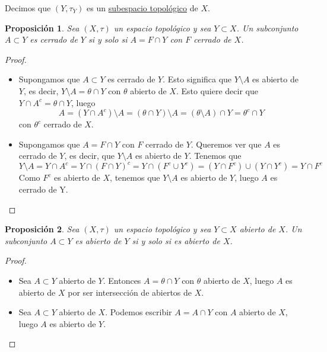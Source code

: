 \documentclass[12pt]{report}
\newtheorem{proposition}{Proposición}[chapter]
\theoremstyle{definition}
\theoremstyle{definition}
\theoremstyle{remark}
\begin{document}
Decimos que $(Y,\tau_Y)$ es un \underline{subespacio topológico} de $X$.

\begin{proposition}
Sea $(X,\tau)$ un espacio topológico y sea $Y \subset X$. Un subconjunto $A \subset Y$ es cerrado de $Y$ si y solo si $A = F \cap Y$ con $F$ cerrado de $X$.
\end{proposition}

\begin{proof}
\hfill
\begin{itemize}
    \item[{\fbox[rb]{$\Rightarrow$}}] Supongamos que $A \subset Y$ es cerrado de $Y$. Esto significa que $Y \setminus A$ es abierto de $Y$, es decir, $Y \setminus A = \theta \cap Y$ con $\theta$ abierto de $X$. Esto quiere decir que $Y \cap A^c = \theta \cap Y$, luego \[A = (Y \cap A^c) \setminus A = (\theta \cap Y) \setminus A = (\theta \setminus A) \cap Y = \theta^c \cap Y\] con $\theta^c$ cerrado de $X$.
    \item[{\fbox[rb]{$\Leftarrow$}}] Supongamos que $A = F \cap Y$ con $F$ cerrado de $Y$. Queremos ver que $A$ es cerrado de $Y$, es decir, que $Y \setminus A$ es abierto de $Y$. Tenemos que \[Y \setminus A = Y \cap A^c = Y \cap (F \cap Y)^c = Y \cap (F^c \cup Y^c) = (Y \cap F^c) \cup (Y \cap Y^c) = Y \cap F^c\] Como $F^c$ es abierto de $X$, tenemos que $Y \setminus A$ es abierto de $Y$, luego $A$ es cerrado de Y.
\end{itemize}
\end{proof}

\begin{proposition} 
\label{prop1.9.}
Sea $(X,\tau)$ un espacio topológico y sea $Y \subset X$ abierto de $X$. Un subconjunto $A \subset Y$ es abierto de $Y$ si y solo si es abierto de $X$.
\end{proposition}

\begin{proof}
\hfill
\begin{itemize}
    \item[{\fbox[rb]{$\Rightarrow$}}] Sea $A \subset Y$ abierto de $Y$. Entonces $A = \theta \cap Y$ con $\theta$ abierto de $X$, luego $A$ es abierto de $X$ por ser intersección de abiertos de $X$.
    \item[{\fbox[rb]{$\Leftarrow$}}] Sea $A \subset Y$ abierto de $X$. Podemos escribir $A = A \cap Y$ con $A$ abierto de $X$, luego $A$ es abierto de $Y$.
\end{itemize}
\end{proof}
\end{document}

